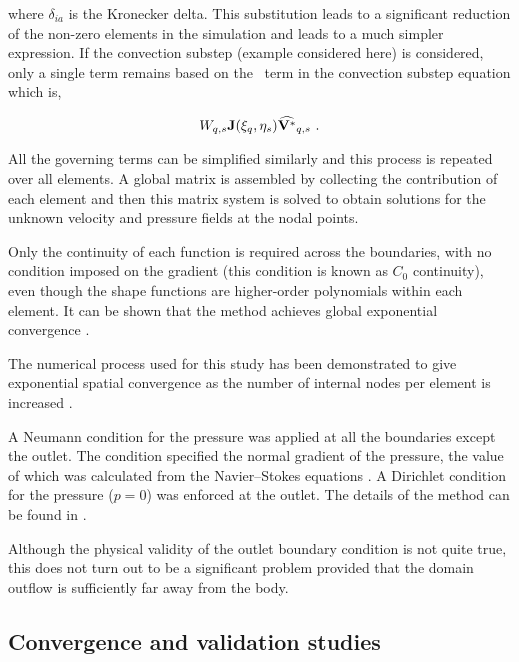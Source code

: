  where $\delta_{ia}$ is the Kronecker delta. This substitution leads to a significant reduction of the non-zero elements in the simulation and leads to a much simpler expression. If the convection substep (example considered here) is considered, only a single term remains based on the \Vint\ term in the convection substep equation which is,


 \begin{equation} \centering
 W_{q,s}\jacobian(\compone_{q},\comptwo_{s})\widehat{\Vint}_{q,s} ~.
 \end{equation}
 
 
 All the governing terms can be simplified similarly and this process is repeated over all elements. A global matrix is assembled by collecting the contribution of each element and then this matrix system is solved to obtain solutions for the unknown velocity and pressure fields at the nodal points. 
 
 Only the continuity of each function is required across the boundaries, with no condition imposed on the gradient (this condition
 is known as $C_{0}$ continuity), even though the shape functions are higher-order polynomials within each element. It can be shown that the method achieves global exponential convergence \citep{karniadakis2005}.  
 
 The numerical process used for this study has been demonstrated to give
 exponential spatial convergence as the number of internal nodes per
 element is increased \citep{Thompson1996a}.
 



A Neumann condition for the pressure was applied at all the boundaries except the outlet. The condition specified the normal gradient of the pressure, the value of which was calculated from the Navier--Stokes equations \citep{gresho1987}. A Dirichlet condition for the pressure ($p=0$) was enforced at the outlet. The details of the method can be found in \citet{Thompson2006,Thompson1996a}.

 Although the physical validity of the outlet boundary condition is not quite true, this does not turn out to be a significant problem provided that the domain outflow is sufficiently far away from the body.

 
\subsection{Convergence and validation studies}

